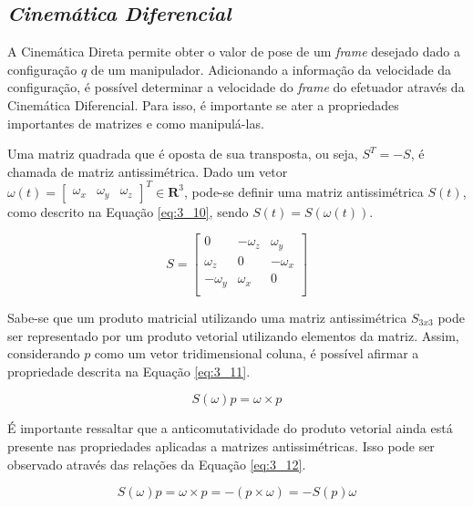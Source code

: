 \subsection{\textit{Cinemática Diferencial}}\label{sec:Cap3_CinDif}

A Cinemática Direta permite obter o valor de pose de um \textit{frame} desejado dado a configuração $q$ de um manipulador. Adicionando a informação da velocidade da configuração, é possível determinar a velocidade do \textit{frame} do efetuador através da Cinemática Diferencial. Para isso, é importante se ater a propriedades importantes de matrizes e como manipulá-las.

Uma matriz quadrada que é oposta de sua transposta, ou seja, $S^T = -S$, é chamada de matriz antissimétrica. Dado um vetor $\omega(t) = \begin{bmatrix}\omega_x & \omega_y & \omega_z\end{bmatrix}^T \in \mathbf{R}^3$, pode-se definir uma matriz antissimétrica $S(t)$, como descrito na Equação \ref{eq:3_10}, sendo $S(t) = S(\omega(t))$.

\begin{equation}
S = 
\begin{bmatrix}
0 & -\omega_z & \omega_y\\
\omega_z & 0 & -\omega_x \\
-\omega_y & \omega_x & 0 \\
\end{bmatrix} 
\label{eq:3_10}
\end{equation}

Sabe-se que um produto matricial utilizando uma matriz antissimétrica $S_{3x3}$ pode ser representado por um produto vetorial utilizando elementos da matriz. Assim, considerando $p$ como um vetor tridimensional coluna, é possível afirmar a propriedade descrita na Equação \ref{eq:3_11}.

\begin{equation}
S(\omega)p = \omega \times p
\label{eq:3_11}
\end{equation}

É importante ressaltar que a anticomutatividade do produto vetorial ainda está presente nas propriedades aplicadas a matrizes antissimétricas. Isso pode ser observado através das relações da Equação \ref{eq:3_12}.

\begin{equation}
S(\omega)p = \omega \times p = -(p \times \omega) = -S(p)\omega
\label{eq:3_12}
\end{equation}


